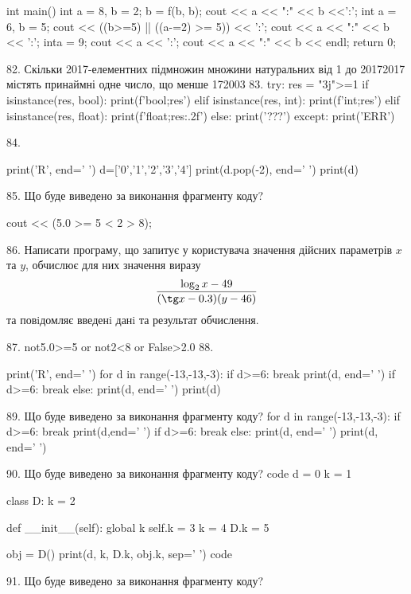 \documentclass[11pt]{article}
\begin{document}
{int main(){
    int a = 8, b = 2;
    b = f(b, b);
    cout << a << ":" << b <<':';
    {
        int a = 6, b = 5;
        cout << ((b>=5) || ((a-=2) >= 5)) << ':';
        cout << a << ":" << b << ':';
    }
    {
        inta = 9;
        cout << a << ':';
    }
    cout << a << ":" << b << endl;
    return 0;
}


82. 
Скільки 2017-елементних підмножин множини натуральних від 1 до 20172017 містять принаймні одне число, що менше 172003
83. 
try:
    res = "3j">=1
    if isinstance(res, bool):
        print(f'bool;{res}')
    elif isinstance(res, int):
        print(f'int;{res}')
    elif isinstance(res, float):
        print(f'float;{res:.2f}')
    else:
        print('???')
except:
    print('ERR')

84. 

print('R', end=' ')
d=['0','1','2','3','4']
print(d.pop(-2), end=' ')
print(d)


85. Що буде виведено за виконання фрагменту коду?

cout << (5.0 >= 5 < 2 > 8);

86. 
Написати програму, що запитує у користувача значення дійсних параметрів $x$ та $y$, обчислює для них значення виразу 
$$\frac{\log_{2} x - 49}{(\tg x - 0.3) (y - 46)}$$ 
та повiдомляє введенi данi та результат обчислення.


87. 
not5.0>=5 or not2<8 or False>2.0
88. 

print('R', end=' ')
for d in range(-13,-13,-3):
    if d>=6:
        break
        print(d, end=' ')
    if d>=6:
        break
    else:
        print(d, end=' ')
    print(d)

89. Що буде виведено за виконання фрагменту коду?
for d in range(-13,-13,-3):
    if d>=6:
        break
        print(d,end=' ')
    if d>=6:
        break
else:
    print(d, end=' ')
print(d, end=' ')

90. Що буде виведено за виконання фрагменту коду?
code
d = 0
k = 1

class D:
    k = 2
    
    def __init__(self):
global k        self.k = 3
        k = 4
        D.k = 5

obj = D()
print(d, k, D.k, obj.k, sep=' ')
code

91. Що буде виведено за виконання фрагменту коду?

}
\end{document}
